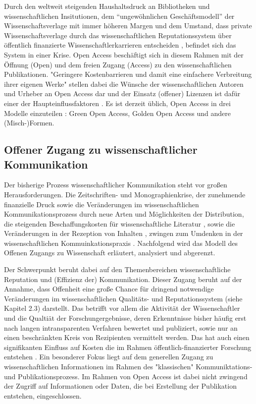 Durch den weltweit steigenden Haushaltsdruck an Bibliotheken und wissenschaftlichen Insitutionen, dem “ungewöhnlichen Geschäftsmodell” \cite{cite:12} der Wissenschaftsverlage mit immer höheren Margen \cite{albert_2006_open_implications} und dem Umstand, dass private Wissenschaftsverlage durch das wissenschaftlichen Reputationssystem über öffentlich finanzierte Wissenschaftlerkarrieren entscheiden \cite{heise_2012}, befindet sich das System in einer Krise\cite{cite:14}. Open Access beschäftigt sich in diesem Rahmen mit der Öffnung (Open) und dem freien Zugang (Access) zu den wissenschaftlichen Publikationen. "Geringere Kostenbarrieren und damit eine einfachere Verbreitung ihrer eigenen Werke" \cite{WD_bundestag_2009} stellen dabei die Wünsche der wissenschaftlichen Autoren und Urheber an Open Access dar und der Einsatz (offener) Lizenzen ist dafür einer der Haupteinflussfaktoren \cite{cite:16}. Es ist derzeit üblich, Open Access in drei Modelle einzuteilen \cite{suchen}: Green Open Access, Golden Open Access und andere (Misch-)Formen.

\subsection{Offener Zugang zu wissenschaftlicher Kommunikation}

Der bisherige Prozess wissenschaftlicher Kommunikation steht vor großen Herausforderungen. Die Zeitschriften- und Monographienkrise, der zunehmende finanzielle Druck sowie die Veränderungen im wissenschaftlichen Kommunikationsprozess durch neue Arten und Möglichkeiten der Distribution, die steigenden Beschaffungskosten für wissenschaftliche Literatur \cite{cite:17}, sowie die Veränderungen in der Rezeption von Inhalten \cite{holub_2013_reception}, zwingen zum Umdenken in der wissenschaftlichen Kommuinkationspraxis \cite{suchen}. Nachfolgend wird das Modell des Offenen Zugangs zu Wissenschaft erläutert, analysiert und abgerenzt.

Der Schwerpunkt beruht dabei auf den Themenbereichen wissenschaftliche Reputation und (Effizienz der) Kommunikation. Dieser Zugang beruht auf der Annahme, dass Offenheit eine große Chance für dringend notwendige Veränderungen im wissenschaftlichen Qualitäts- und Reputationssystem (siehe Kapitel 2.3) darstellt. Das betrifft vor allem die Aktivität der Wissenschaftler und die Qualtiät der Forschungergebnisse, deren Erkenntnisse bisher häufig erst nach langen intransparenten Verfahren bewertet und publiziert, sowie nur an einen beschränkten Kreis von Rezipienten vermittelt werden. Das hat auch einen signifikanten Einfluss auf Kosten die im Rahmen öffentlich-finanzierter Forschung entstehen \cite{suchen}. Ein besonderer Fokus liegt auf dem generellen Zugang zu wissenschaftlichen Informationen im Rahmen des "klassischen" Kommuniktations- und Publikationsprozess. Im Rahmen von Open Access ist dabei nicht zwingend der Zugriff auf Informationen oder Daten, die bei Erstellung der Publikation entstehen, eingeschlossen. 

